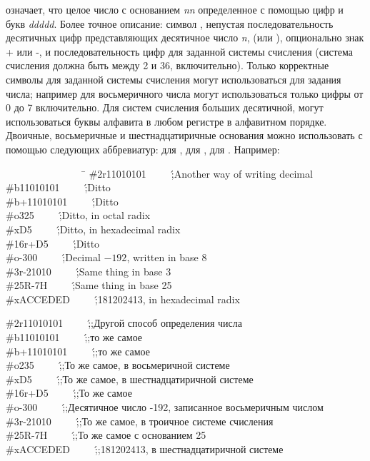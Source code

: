 означает, что целое число с основанием {\it nn} определенное с
помощью цифр и букв {\it ddddd}. Более точное описание:
символ \cd{\#}, непустая последовательность десятичных цифр
представляющих десятичное число {\it n},  (или ), опционально знак + или -, и последовательность цифр для заданной системы счисления (система счисления должна быть между 2 и 36, включительно). Только корректные символы для заданной системы счисления могут использоваться для задания числа; например для восьмеричного числа могут использоваться только цифры от 0 до 7 включительно. Для систем счисления больших десятичной, могут использоваться буквы алфавита в любом регистре в алфавитном порядке. Двоичные, восьмеричные и шестнадцатиричные основания можно использовать с помощью следующих аббревиатур:  для ,  для ,  для . Например:
\begin{lisp}
~~~~~~~~~~~~~~~~\=\kill
\>\#2r11010101~~~~~\';{\rm Another way of writing  decimal} \\
\>\#b11010101~~~~~\';{\rm Ditto} \\
\>\#b+11010101~~~~~\';{\rm Ditto} \\
\>\#o325~~~~~\';{\rm Ditto, in octal radix} \\
\>\#xD5~~~~~\';{\rm Ditto, in hexadecimal radix} \\
\>\#16r+D5~~~~~\';{\rm Ditto} \\
\>\#o-300~~~~~\';{\rm Decimal \(-192\), written in base 8} \\
\>\#3r-21010~~~~~\';{\rm Same thing in base 3} \\
\>\#25R-7H~~~~~\';{\rm Same thing in base 25} \\
\>\#xACCEDED~~~~~\';{\rm 181202413, in hexadecimal radix}
\end{lisp}

\begin{lisp}
\>\#2r11010101~~~~~\';{\rm ;Другой способ определения
числа } \\
\>\#b11010101~~~~~\';{\rm ;то же самое} \\
\>\#b+11010101~~~~~\';{\rm ;то же самое} \\
\>\#o235~~~~~\';{\rm ;То же самое, в восьмеричной системе} \\
\>\#xD5~~~~~\';{\rm ;То же самое, в шестнадцатиричной системе} \\
\>\#16r+D5~~~~~\';{\rm ;То же самое} \\
\>\#o-300~~~~~\';{\rm ;Десятичное число -192, записанное восьмеричным числом} \\
\>\#3r-21010~~~~~\';{\rm ;То же самое, в троичное системе счисления} \\
\>\#25R-7H~~~~~\';{\rm ;То же самое с основанием 25} \\
\>\#xACCEDED~~~~~\';{\rm ;181202413, в шестнадцатиричной системе}
\end{lisp}

